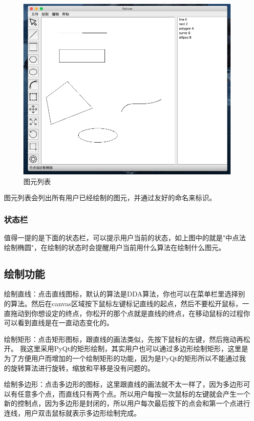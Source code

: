 \documentclass[11pt, a4paper, UTF8]{ctexart}
\begin{document}
\begin{figure}[H]
    \centering
    \includegraphics[scale=0.5]{item_list.png}
    \caption{图元列表}
\end{figure}

图元列表会列出所有用户已经绘制的图元，并通过友好的命名来标识。


\subsubsection{状态栏}

值得一提的是下面的状态栏，可以提示用户当前的状态，如上图中的就是"中点法绘制椭圆"，在绘制的状态时会提醒用户当前用什么算法在绘制什么图元。

\subsection{绘制功能}

绘制直线：点击直线图标，默认的算法是DDA算法，你也可以在菜单栏里选择别的算法。然后在canvas区域按下鼠标左键标记直线的起点，然后不要松开鼠标，一直拖动到你想设定的终点，你松开的那个点就是直线的终点，在移动鼠标的过程你可以看到直线是在一直动态变化的。

绘制矩形：点击矩形图标，跟直线的画法类似，先按下鼠标的左键，然后拖动再松开。 我这里采用PyQt的矩形绘制，其实用户也可以通过多边形绘制矩形，这里是为了方便用户而增加的一个绘制矩形的功能，因为是PyQt的矩形所以不能通过我的旋转算法进行旋转，缩放和平移是没有问题的。

绘制多边形：点击多边形的图标，这里跟直线的画法就不太一样了，因为多边形可以有任意多个点，而直线只有两个点。所以用户每按一次鼠标的左键就会产生一个新的控制点，因为多边形是封闭的，所以用户每次最后按下的点会和第一个点进行连线，用户双击鼠标就表示多边形绘制完成。
\end{document}
